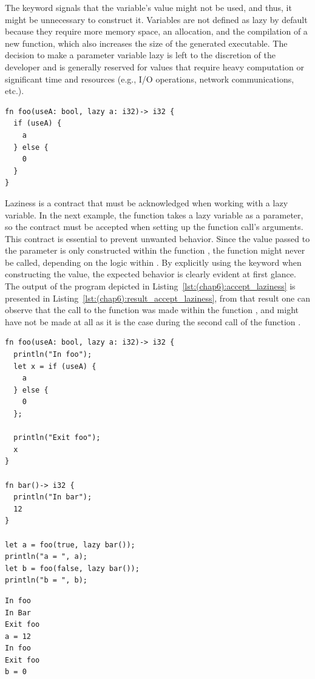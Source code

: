 The keyword  signals that the variable's value might not be used,
and thus, it might be unnecessary to construct it. Variables are not defined as
lazy by default because they require more memory space, an allocation, and the
compilation of a new function, which also increases the size of the generated
executable. The decision to make a parameter variable lazy is left to the
discretion of the developer and is generally reserved for values that require
heavy computation or significant time and resources (e.g., I/O operations,
network communications, etc.).

\begin{lstlisting}[style=coloredverbatim]
fn foo(useA: bool, lazy a: i32)-> i32 {
  if (useA) {
    a
  } else {
    0
  }
}
\end{lstlisting}

Laziness is a contract that must be acknowledged when working with a lazy
variable. In the next example, the function  takes a lazy variable as
a parameter, so the contract must be accepted when setting up the function
call's arguments. This contract is essential to prevent unwanted behavior. Since
the value passed to the parameter  is only constructed within the
function , the function  might never be called, depending
on the logic within . By explicitly using the  keyword
when constructing the value, the expected behavior is clearly evident at first
glance. The output of the program depicted in Listing~\ref{lst:(chap6):accept_laziness}
is presented in Listing~\ref{lst:(chap6):result_accept_laziness}, from that result one
can observe that the call to the function  was made within the
function , and might have not be made at all as it is the case during
the second call of the function .

\begin{lstlisting}[style=coloredverbatim, label=lst:(chap6):accept_laziness, caption=Example of laziness contract acceptance]
fn foo(useA: bool, lazy a: i32)-> i32 {
  println("In foo");
  let x = if (useA) {
    a
  } else {
    0
  };

  println("Exit foo");
  x
}

fn bar()-> i32 {
  println("In bar");
  12
}

let a = foo(true, lazy bar());
println("a = ", a);
let b = foo(false, lazy bar());
println("b = ", b);
\end{lstlisting}

\begin{lstlisting}[style=bashVerb, caption=Result of execution of Listing~\ref{lst:(chap6):accept_laziness}, label=lst:(chap6):result_accept_laziness]
In foo
In Bar
Exit foo
a = 12
In foo
Exit foo
b = 0
\end{lstlisting}

